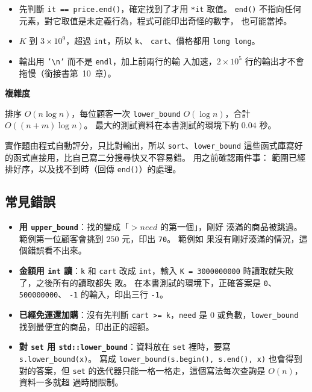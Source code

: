 \begin{itemize}
\item 先判斷 \texttt{it == price.end()}，確定找到了才用 \texttt{*it} 取值。
\texttt{end()} 不指向任何元素，對它取值是未定義行為，程式可能印出奇怪的數字，
也可能當掉。
\item $K$ 到 $3 \times 10^9$，超過 \texttt{int}，所以 \texttt{k}、
\texttt{cart}、價格都用 \texttt{long long}。
\item 輸出用 \texttt{'\textbackslash n'} 而不是 \texttt{endl}，加上前兩行的輸
入加速，$2 \times 10^5$ 行的輸出才不會拖慢（銜接書第~10~章）。
\end{itemize}

\textbf{複雜度}

排序 $O(n \log n)$，每位顧客一次 \texttt{lower\_bound} $O(\log n)$，合計
$O((n + m) \log n)$。 最大的測試資料在本書測試的環境下約 $0.04$ 秒。

\begin{apcsnote}
實作題由程式自動評分，只比對輸出，所以 \texttt{sort}、\texttt{lower\_bound}
這些函式庫寫好的函式直接用，比自己寫二分搜尋快又不容易錯。 用之前確認兩件事：
範圍已經排好序，以及找不到時（回傳 \texttt{end()}）的處理。
\end{apcsnote}

\subsection{常見錯誤}

\begin{itemize}
\item \textbf{用 \texttt{upper\_bound}}：找的變成「$> need$ 的第一個」，剛好
湊滿的商品被跳過。 範例第一位顧客會挑到 $250$ 元，印出 \texttt{70}。 範例如
果沒有剛好湊滿的情況，這個錯誤看不出來。
\item \textbf{金額用 \texttt{int} 讀}：\texttt{k} 和 \texttt{cart} 改成
\texttt{int}，輸入 \texttt{K = 3000000000} 時讀取就失敗了，之後所有的讀取都失
敗。 在本書測試的環境下，正確答案是 \texttt{0}、\texttt{500000000}、
\texttt{-1} 的輸入，印出三行 \texttt{-1}。
\item \textbf{已經免運還加購}：沒有先判斷 \texttt{cart >= k}，\texttt{need}
是 $0$ 或負數，\texttt{lower\_bound} 找到最便宜的商品，印出正的超額。
\item \textbf{對 \texttt{set} 用 \texttt{std::lower\_bound}}：資料放在
\texttt{set} 裡時，要寫 \texttt{s.lower\_bound(x)}。 寫成
\texttt{lower\_bound(s.begin(), s.end(), x)} 也會得到對的答案，但
\texttt{set} 的迭代器只能一格一格走，這個寫法每次查詢是 $O(n)$，資料一多就超
過時間限制。
\end{itemize}

